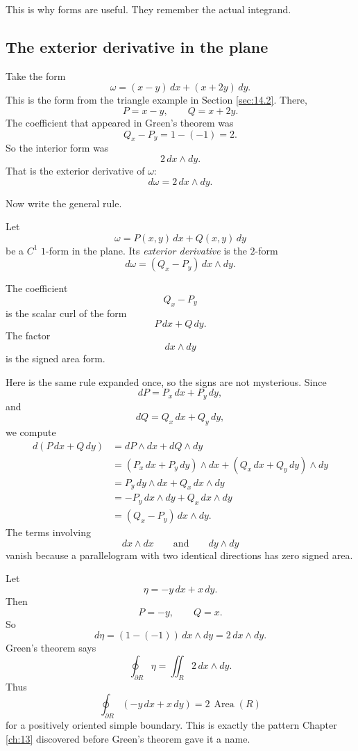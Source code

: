This is why forms are useful.  They remember the actual integrand.

\subsection{The exterior derivative in the plane}

Take the form
\[
    \omega=(x-y)\,dx+(x+2y)\,dy.
\]
This is the form from the triangle example in Section \ref{sec:14.2}.  There,
\[
    P=x-y,
    \qquad
    Q=x+2y.
\]
The coefficient that appeared in Green's theorem was
\[
    Q_x-P_y=1-(-1)=2.
\]
So the interior form was
\[
    2\,dx\wedge dy.
\]
That is the exterior derivative of \(\omega\):
\[
\boxed{
    d\omega=2\,dx\wedge dy.
}
\]

Now write the general rule.

\begin{definition}
Let
\[
    \omega=P(x,y)\,dx+Q(x,y)\,dy
\]
be a \(C^1\) \(1\)-form in the plane.  Its \emph{exterior derivative} is the \(2\)-form
\[
\boxed{
    d\omega=(Q_x-P_y)\,dx\wedge dy.
}
\]
\end{definition}

The coefficient
\[
    Q_x-P_y
\]
is the scalar curl of the form
\[
    P\,dx+Q\,dy.
\]
The factor
\[
    dx\wedge dy
\]
is the signed area form.

Here is the same rule expanded once, so the signs are not mysterious.  Since
\[
    dP=P_x\,dx+P_y\,dy,
\]
and
\[
    dQ=Q_x\,dx+Q_y\,dy,
\]
we compute
\[
\begin{aligned}
    d(P\,dx+Q\,dy)
    &=
    dP\wedge dx+dQ\wedge dy\\
    &=
    (P_x\,dx+P_y\,dy)\wedge dx
    +
    (Q_x\,dx+Q_y\,dy)\wedge dy\\
    &=
    P_y\,dy\wedge dx+Q_x\,dx\wedge dy\\
    &=
    -P_y\,dx\wedge dy+Q_x\,dx\wedge dy\\
    &=
    (Q_x-P_y)\,dx\wedge dy.
\end{aligned}
\]
The terms involving
\[
    dx\wedge dx
    \qquad\text{and}\qquad
    dy\wedge dy
\]
vanish because a parallelogram with two identical directions has zero signed area.

\begin{example}
Let
\[
    \eta=-y\,dx+x\,dy.
\]
Then
\[
    P=-y,
    \qquad
    Q=x.
\]
So
\[
    d\eta=(1-(-1))\,dx\wedge dy=2\,dx\wedge dy.
\]
Green's theorem says
\[
    \oint_{\partial R}\eta
    =
    \iint_R 2\,dx\wedge dy.
\]
Thus
\[
    \oint_{\partial R}(-y\,dx+x\,dy)
    =
    2\,\operatorname{Area}(R)
\]
for a positively oriented simple boundary.  This is exactly the pattern Chapter
\ref{ch:13} discovered before Green's theorem gave it a name.
\end{example}

